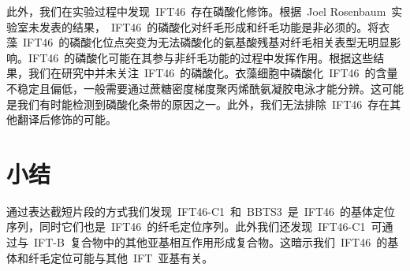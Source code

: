 此外，我们在实验过程中发现\ IFT46\ 存在磷酸化修饰。根据\ Joel Rosenbaum\ 实验室未发表的结果，\ IFT46\ 的磷酸化对纤毛形成和纤毛功能是非必须的。将衣藻\ IFT46\ 的磷酸化位点突变为无法磷酸化的氨基酸残基对纤毛相关表型无明显影响。IFT46\ 的磷酸化可能在其参与非纤毛功能的过程中发挥作用。根据这些结果，我们在研究中并未关注\ IFT46\ 的磷酸化。衣藻细胞中磷酸化\ IFT46\ 的含量不稳定且偏低，一般需要通过蔗糖密度梯度聚丙烯酰氨凝胶电泳才能分辨。这可能是我们有时能检测到磷酸化条带的原因之一。此外，我们无法排除\ IFT46\ 存在其他翻译后修饰的可能。

\section{小结}
通过表达截短片段的方式我们发现\ IFT46-C1\ 和\ BBTS3\ 是\ IFT46\ 的基体定位序列，同时它们也是\ IFT46\ 的纤毛定位序列。此外我们还发现\ IFT46-C1\ 可通过与\ IFT-B\ 复合物中的其他亚基相互作用形成复合物。这暗示我们\ IFT46\ 的基体和纤毛定位可能与其他\ IFT\ 亚基有关。